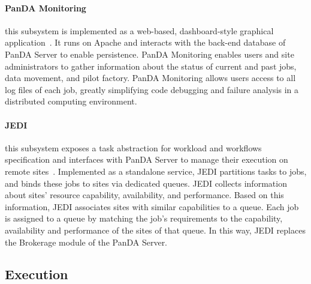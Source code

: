 \paragraph{\textbf{PanDA Monitoring}} this subsystem is implemented as a
web-based, dashboard-style graphical application~\cite{klimentov2011atlas}. It
runs on Apache and interacts with the back-end database of PanDA Server to
enable persistence. PanDA Monitoring enables users and site administrators to
gather information about the status of current and past jobs, data movement, and
pilot factory. PanDA Monitoring allows users access to all log files of each
job, greatly simplifying code debugging and failure analysis in a distributed
computing environment.

\paragraph{\textbf{JEDI}} this subsystem exposes a task abstraction for workload
and workflows specification and interfaces with PanDA Server to manage their
execution on remote sites~\cite{borodin2015scaling}. Implemented as a standalone
service, JEDI partitions tasks to jobs, and binds these jobs to sites via
dedicated queues. JEDI collects information about sites' resource capability,
availability, and performance. Based on this information, JEDI associates sites
with similar capabilities to a queue. Each job is assigned to a queue by
matching the job's requirements to the capability, availability and performance
of the sites of that queue. In this way, JEDI replaces the Brokerage module of
the PanDA Server.


\subsection{Execution}
\label{ssec:panda_exec}


